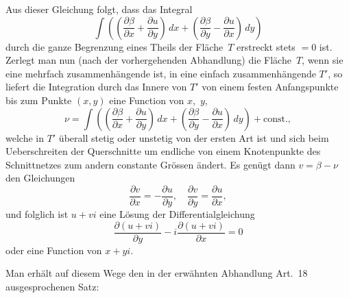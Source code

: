 \documentclass[a4paper,12pt,leqno]{article}
\begin{document}
Aus dieser Gleichung folgt, dass das Integral
\[ \int  \left(
            \left(
               \frac{\partial \beta}{\partial x}
             + \frac{\partial u}{\partial y}
            \right) \, dx
          + \left(
               \frac{\partial \beta}{\partial y}
             - \frac{\partial u}{\partial x}
            \right) \, dy
         \right) \]
durch die ganze Begrenzung eines Theils der Fl\"{a}che~$T$
erstreckt stets $= 0$ ist. Zerlegt man nun (nach der
vorhergehenden Abhandlung) die Fl\"{a}che~$T$, wenn sie eine
mehrfach zusammenh\"{a}ngende ist, in eine einfach
zusammenh\"{a}ngende $T'$, so liefert die Integration durch das
Innere von $T'$ von einem festen Anfangspunkte bis zum Punkte
$(x,y)$ eine Function von $x$,~$y$,
\[ \nu = \int
         \left(
            \left(
               \frac{\partial \beta}{\partial x}
             + \frac{\partial u}{\partial y}
            \right) \, dx
          + \left(
               \frac{\partial \beta}{\partial y}
             - \frac{\partial u}{\partial x}
            \right) \, dy
         \right)
      + \mbox{const.},\]
welche in $T'$ \"{u}berall stetig oder unstetig von der ersten
Art ist und sich beim Ueberschreiten der Querschnitte um endliche
von einem Knotenpunkte des Schnittnetzes zum andern constante
Gr\"{o}ssen \"{a}ndert.  Es gen\"{u}gt dann $v = \beta - \nu$ den
Gleichungen
\[     \frac{\partial v}{\partial x}
   = - \frac{\partial u}{\partial y},\quad
       \frac{\partial v}{\partial y}
   =   \frac{\partial u}{\partial x},\]
und folglich ist $u + vi$ eine L\"{o}sung der
Differentialgleichung
\[      \frac{\partial (u + vi)}{\partial y}
    - i \frac{\partial (u + vi)}{\partial x} = 0 \]
oder eine Function von $x + yi$.

Man erh\"{a}lt auf diesem Wege den in der erw\"{a}hnten
Abhandlung Art.~18 ausgesprochenen Satz:
\end{document}
